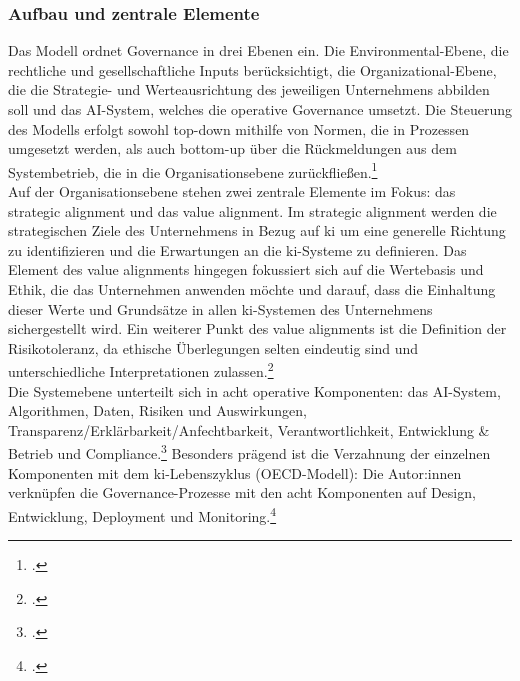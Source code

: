 \subsubsection{Aufbau und zentrale Elemente}
\label{subsubsec:hourglass_aufbau}
Das Modell ordnet Governance in drei Ebenen ein.
Die Environmental-Ebene, die rechtliche und gesellschaftliche Inputs berücksichtigt, die Organizational-Ebene, die die Strategie- und Werteausrichtung des jeweiligen Unternehmens abbilden soll und das AI-System, welches die operative Governance umsetzt.
Die Steuerung des Modells erfolgt sowohl \glqq{}top-down\grqq{} mithilfe von Normen, die in Prozessen umgesetzt werden, als auch \glqq{}bottom-up\grqq{} über die Rückmeldungen aus dem Systembetrieb, die in die Organisationsebene zurückfließen.\footcite[5-7]{mantymakiPDFPuttingAI2025}
\\
Auf der Organisationsebene stehen zwei zentrale Elemente im Fokus: das \glqq{}strategic alignment\grqq{} und das \glqq{}value alignment\grqq{}.
Im \glqq{}strategic alignment\grqq{} werden die strategischen Ziele des Unternehmens in Bezug auf \ac{ki} um eine generelle Richtung zu identifizieren und die Erwartungen an die \ac{ki}-Systeme zu definieren.
Das Element des \glqq{}value alignments\grqq{} hingegen fokussiert sich auf die Wertebasis und Ethik, die das Unternehmen anwenden möchte und darauf, dass die Einhaltung dieser Werte und Grundsätze in allen \ac{ki}-Systemen des Unternehmens sichergestellt wird.
Ein weiterer Punkt des \glqq{}value alignments\grqq{} ist die Definition der Risikotoleranz, da ethische Überlegungen selten eindeutig sind und unterschiedliche Interpretationen zulassen.\footcite[7]{mantymakiPDFPuttingAI2025}
\\
Die Systemebene unterteilt sich in acht operative Komponenten: das AI-System, Algorithmen, Daten, Risiken und Auswirkungen, Transparenz/Erklärbarkeit/Anfechtbarkeit, Verantwortlichkeit, Entwicklung \& Betrieb und Compliance.\footcite[7-12]{mantymakiPDFPuttingAI2025}
Besonders prägend ist die Verzahnung der einzelnen Komponenten mit dem \ac{ki}-Lebenszyklus (OECD-Modell): Die Autor:innen verknüpfen die Governance-Prozesse mit den acht Komponenten auf Design, Entwicklung, Deployment und Monitoring.\footcite[9-12]{mantymakiPDFPuttingAI2025}

